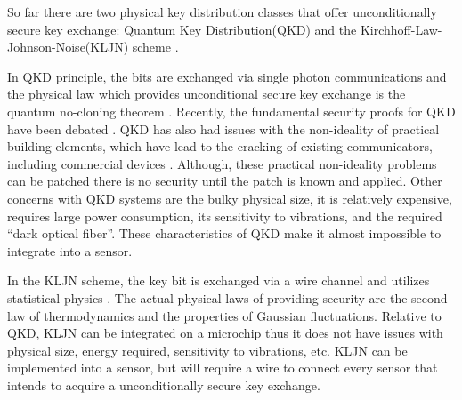 \documentclass{ws-fnl2}
\begin{document}
So far there are two physical key distribution classes that offer unconditionally secure key exchange: Quantum Key Distribution(QKD) \cite{bb84} and the Kirchhoff-Law-Johnson-Noise(KLJN) scheme \cite{kljn1, lk1, lk2, lk3, kljn_its, kljn_noise_properties, kljn_noise_properties2, barry1, barry2, c186, c187a, c174, c171, c169, c147, c141, c133, c128, c118, c111, c113, c+6, barry3}.

In QKD principle, the bits are exchanged via single photon communications and the physical law which provides unconditional secure key exchange is the quantum no-cloning theorem \cite{bb84}. Recently, the fundamental security proofs for QKD have been debated \cite{yuen1, yuen2, hirota}. QKD has also had issues with the non-ideality of practical building elements, which have lead to the cracking of existing communicators, including commercial devices \cite{crack1, crack2, crack3, crack4, crack5, crack6, crack7, crack8, crack9, crack10}. Although, these practical non-ideality problems can be patched there is no security until the patch is known and applied. Other concerns with QKD systems are the bulky physical size, it is relatively expensive, requires large power consumption, its sensitivity to vibrations, and the required ``dark optical fiber''. These characteristics of QKD make it almost impossible to integrate into a sensor. 

In the KLJN scheme, the key bit is exchanged via a wire channel and utilizes statistical physics \cite{kljn1}. The actual physical laws of providing security are the second law of thermodynamics and the properties of Gaussian fluctuations. Relative to QKD, KLJN can be integrated on a microchip thus it does not have issues with physical size, energy required, sensitivity to vibrations, etc. KLJN can be implemented into a sensor, but will require a wire to connect every sensor that intends to acquire a unconditionally secure key exchange.
\end{document}

